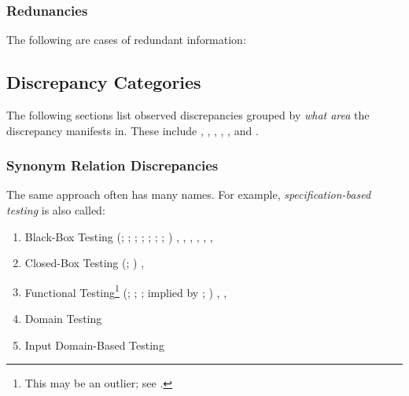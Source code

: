 

\ifnotpaper
    \subsubsection{Redunancies}
    \label{redun}
    The following are cases of redundant information:

    
\fi

\subsection{Discrepancy Categories}
\label{discrepCategories}

The following sections list observed discrepancies grouped by \emph{what area}
the discrepancy manifests in. These include , ,
, , , and .

\subsubsection{Synonym Relation Discrepancies}
\label{syns}

The same approach often has many names. For example,
\emph{specification-based testing} is also called:
\begin{enumerate}
    \item Black-Box Testing
          \ifnotpaper
              (\citealp[p.~9]{IEEE2022}; \citeyear[p.~8]{IEEE2021};
              \citeyear[p.~431]{IEEE2017}; \citealp[p.~5-10]{SWEBOK2024};
              \citealpISTQB{}; \citealp[p.~46 (without hyphen)]{Firesmith2015};
              \citealp[p.~344]{SakamotoEtAl2013}; \citealp[p.~399]{vanVliet2000})
          \else
              \cite[p.~431]{IEEE2017}, \cite{ISTQB}, \cite[p.~5-10]{SWEBOK2024},
              \cite[p.~9]{IEEE2022}, \cite[p.~399]{vanVliet2000},
              \cite[p.~8]{IEEE2021}, %
              \cite[p.~344]{SakamotoEtAl2013}
          \fi
    \item Closed-Box Testing
          \ifnotpaper
              (\citealp[p.~9]{IEEE2022}; \citeyear[p.~431]{IEEE2017})
          \else
              \cite[p.~431]{IEEE2017}, \cite[p.~9]{IEEE2022}
          \fi
    \item Functional Testing\footnote{This may be an outlier; see
              .}
          \ifnotpaper
              (\citealp[p.~196]{IEEE2017}; \citealp[p.~44]{Kam2008};
              \citealp[p.~399]{vanVliet2000}; implied by \citealp[p.~129]{IEEE2021};
              \citeyear[p.~431]{IEEE2017})
          \else
              \cite[p.~196]{IEEE2017}, \cite[p.~399]{vanVliet2000},
              \cite[p.~44]{Kam2008}
          \fi
    \item Domain Testing \citep[p.~5-10]{SWEBOK2024}
          \ifnotpaper
    \item Input Domain-Based Testing \citetext{implied by
              \citealp[p.~4-8]{SWEBOK2014}}
          \fi
\end{enumerate}


